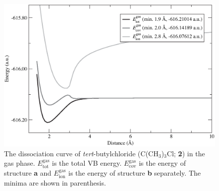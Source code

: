 \begin{figure}[b]
\begin{center}
\includegraphics[scale=0.55]{dissociation/figures/c4h9cl_g.eps}
\end{center}
\caption{The dissociation curve of \textit{tert}-butylchloride (C(CH$_3$)$_3$Cl; \textbf{2}) in the gas phase. $E_\mathrm{tot}^\mathrm{gas}$ is the total VB energy. $E_\mathrm{cov}^\mathrm{gas}$ is the energy of structure \textbf{a} and $E_\mathrm{ion}^\mathrm{gas}$ is the energy of structure \textbf{b} separately. The minima are shown in parenthesis.}
\label{ch3.fig.c4h9cl}
\end{figure}

